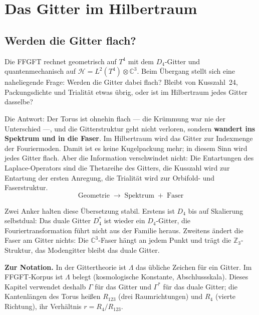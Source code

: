 \chapter{Das Gitter im Hilbertraum}
\label{ch:gitter}

\section{Werden die Gitter flach?}

Die FFGFT rechnet geometrisch auf $T^4$ mit dem $D_4$-Gitter und
quantenmechanisch auf $\mathcal{H} = L^2(T^4)\otimes\mathbb{C}^3$. Beim
Übergang stellt sich eine naheliegende Frage: Werden die Gitter dabei
flach? Bleibt von Kusszahl~24, Packungsdichte und Trialität etwas
übrig, oder ist im Hilbertraum jedes Gitter dasselbe?

Die Antwort: Der Torus ist ohnehin flach --- die Krümmung war nie der
Unterschied ---, und die Gitterstruktur geht nicht verloren, sondern
\textbf{wandert ins Spektrum und in die Faser}. Im Hilbertraum wird das
Gitter zur Indexmenge der Fouriermoden. Damit ist es keine Kugelpackung
mehr; in diesem Sinn wird jedes Gitter flach. Aber die Information
verschwindet nicht: Die Entartungen des Laplace-Operators sind die
Thetareihe des Gitters, die Kusszahl wird zur Entartung der ersten
Anregung, die Trialität wird zur Orbifold- und Faserstruktur.
\begin{equation}
  \boxed{\;\text{Geometrie}\;\longrightarrow\;\text{Spektrum}\;+\;\text{Faser}\;}
\end{equation}

Zwei Anker halten diese Übersetzung stabil. Erstens ist $D_4$ bis auf
Skalierung selbstdual: Das duale Gitter $D_4^*$ ist wieder ein
$D_4$-Gitter, die Fouriertransformation führt nicht aus der Familie
heraus. Zweitens ändert die Faser am Gitter nichts: Die
$\mathbb{C}^3$-Faser hängt an jedem Punkt und trägt die
$\mathbb{Z}_3$-Struktur, das Modengitter bleibt das duale Gitter.

\textbf{Zur Notation.} In der Gittertheorie ist $\Lambda$ das übliche
Zeichen für ein Gitter. Im FFGFT-Korpus ist $\Lambda$ belegt (kosmologische
Konstante, Abschlussskala). Dieses Kapitel verwendet deshalb $\Gamma$
für das Gitter und $\Gamma^*$ für das duale Gitter; die Kantenlängen des
Torus heißen $R_{123}$ (drei Raumrichtungen) und $R_4$ (vierte Richtung),
ihr Verhältnis $r = R_4/R_{123}$.

